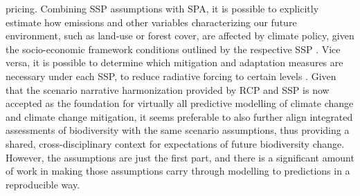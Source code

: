 \documentclass[titlesmallcaps,copyrightpage]{uomthesis}\usepackage[]{graphicx}\usepackage[]{color}
\begin{document}
pricing. Combining SSP assumptions with SPA, it is possible to explicitly estimate how emissions and other variables characterizing our future environment, such as land-use or forest cover, are affected by climate policy, given the socio-economic framework conditions outlined by the respective SSP \citep{kriegler_new_2014, riahi_shared_2017}. Vice versa, it is possible to determine which mitigation and adaptation measures are necessary under each SSP, to reduce radiative forcing to certain levels \citep[for example in order to achieve the Paris warming target,][]{wigley_paris_2018}. Given that the scenario narrative harmonization provided by RCP and SSP is now accepted as the foundation for virtually all predictive modelling of climate change and climate change mitigation, it seems preferable to also further align integrated assessments of biodiversity with the same scenario assumptions, thus providing a shared, cross-disciplinary context for expectations of future biodiversity change. However, the assumptions are just the first part, and there is a significant amount of work in making those assumptions carry through modelling to predictions in a reproducible way. 
\end{document}
